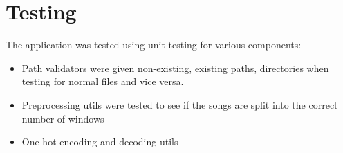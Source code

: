 \newpage
\section{Testing}

The application was tested using unit-testing for various components:
\begin{itemize}
	\item Path validators were given non-existing, existing paths, directories when testing for normal files and vice versa.
	\item Preprocessing utils were tested to see if the songs are split into the correct number of windows
	\item One-hot encoding and decoding utils
\end{itemize}